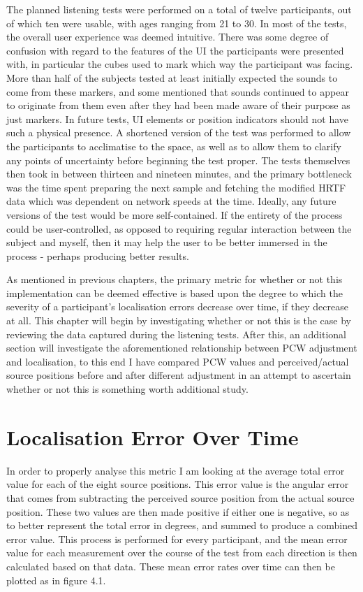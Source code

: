 The planned listening tests were performed on a total of twelve participants, out of which ten were usable, with ages ranging from 21 to 30. In most of the tests, the overall user experience was deemed intuitive. There was some degree of confusion with regard to the features of the UI the participants were presented with, in particular the cubes used to mark which way the participant was facing. More than half of the subjects tested at least initially expected the sounds to come from these markers, and some mentioned that sounds continued to appear to originate from them even after they had been made aware of their purpose as just markers. In future tests, UI elements or position indicators should not have such a physical presence. A shortened version of the test was performed to allow the participants to acclimatise to the space, as well as to allow them to clarify any points of uncertainty before beginning the test proper. The tests themselves then took in between thirteen and nineteen minutes, and the primary bottleneck was the time spent preparing the next sample and fetching the modified HRTF data which was dependent on network speeds at the time. Ideally, any future versions of the test would be more self-contained. If the entirety of the process could be user-controlled, as opposed to requiring regular interaction between the subject and myself, then it may help the user to be better immersed in the process - perhaps producing better results. 

As mentioned in previous chapters, the primary metric for whether or not this implementation can be deemed effective is based upon the degree to which the severity of a participant's localisation errors decrease over time, if they decrease at all. This chapter will begin by investigating whether or not this is the case by reviewing the data captured during the listening tests. After this, an additional section will investigate the aforementioned relationship between PCW adjustment and localisation, to this end I have compared PCW values and perceived/actual source positions before and after different adjustment in an attempt to ascertain whether or not this is something worth additional study.

\section{Localisation Error Over Time}
In order to properly analyse this metric I am looking at the average total error value for each of the eight source positions. This error value is the angular error that comes from subtracting the perceived source position from the actual source position. These two values are then made positive if either one is negative, so as to better represent the total error in degrees, and summed to produce a combined error value. This process is performed for every participant, and the mean error value for each measurement over the course of the test from each direction is then calculated based on that data. These mean error rates over time can then be plotted as in figure 4.1. 

